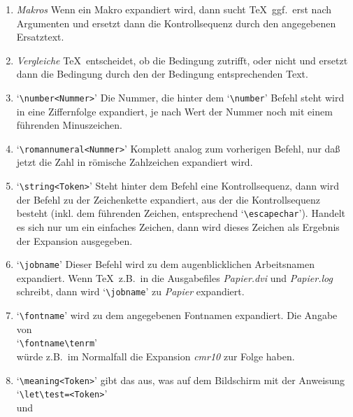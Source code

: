 \begin{enumerate}
\item {\em Makros} Wenn ein Makro expandiert wird, dann sucht \TeX\
ggf.\ erst nach Argumenten und ersetzt dann die
Kontrollsequenz durch
den angegebenen Ersatztext.
\item {\em Vergleiche} \TeX\ entscheidet, ob die Bedingung zutrifft,
oder nicht und ersetzt dann die Bedingung durch den der Bedingung
entsprechenden Text.
\item {}
`\verb|\number<Nummer>|' Die Nummer, die hinter dem
`\verb|\number|' Befehl steht wird in eine 
Ziffernfolge expandiert, je
nach Wert der Nummer noch mit einem f\"uhrenden 
Minuszeichen.
\item {}
`\verb|\romannumeral<Nummer>|' Komplett analog zum vorherigen
Befehl, nur da\ss{} jetzt die Zahl in r\"omische Zahlzeichen expandiert
wird.
\item {}
`\verb|\string<Token>|' Steht hinter dem Befehl eine
Kontrollsequenz, dann wird der Befehl zu der Zeichenkette expandiert,
aus der die Kontrollsequenz besteht (inkl. dem f\"uhrenden Zeichen,
entsprechend \index{Escape}
`\verb|\escapechar|'). Handelt es sich nur um ein
einfaches Zeichen, dann wird dieses Zeichen als Ergebnis der Expansion
ausgegeben.
\item {}
`\verb|\jobname|' Dieser Befehl wird zu dem augenblicklichen
Arbeitsnamen expandiert. Wenn \TeX\ z.B.\ in die 
Ausgabefiles
{\em Papier.dvi} und {\em Papier.log} schreibt, dann wird
`\verb|\jobname|' zu {\em Papier} expandiert.
\item {}
`\verb|\fontname|' wird zu dem angegebenen Fontnamen expandiert.
Die Angabe von\\`\verb|\fontname\tenrm|'\\w\"urde z.B.\ im
Normalfall die Expansion {\em cmr10} zur Folge haben.
\item {}
`\verb|\meaning<Token>|' gibt das aus, was auf dem Bildschirm
mit der Anweisung\\
`\verb|\let\test=<Token>|'\\und\\

\end{enumerate}
